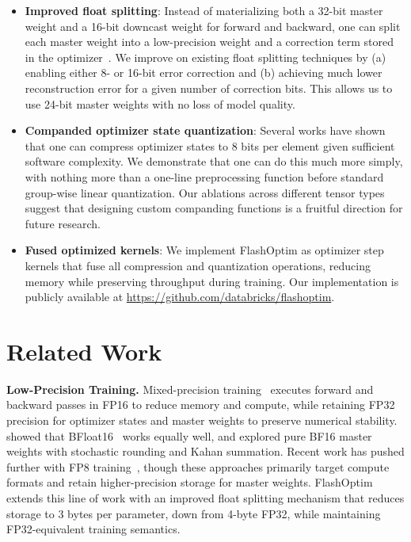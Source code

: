 \documentclass[10pt,twocolumn,letterpaper]{article}
\theoremstyle{plain}
\theoremstyle{definition}
\theoremstyle{remark}
\newcommand{\flashOptim}{FlashOptim\xspace}
\begin{document}
\begin{itemize}[itemsep=-2pt]
    \item \textbf{Improved float splitting}: Instead of materializing both a 32-bit master weight and a 16-bit downcast weight for forward and backward, one can split each master weight into a low-precision weight and a correction term stored in the optimizer~\citep{zamirai2020revisiting,warner2024optimi}. We improve on existing float splitting techniques by (a) enabling either 8- or 16-bit error correction and (b) achieving much lower reconstruction error for a given number of correction bits. This allows us to use 24-bit master weights with no loss of model quality.
    \item \textbf{Companded optimizer state quantization}: Several works have shown that one can compress optimizer states to 8 bits per element given sufficient software complexity. We demonstrate that one can do this much more simply, with nothing more than a one-line preprocessing function before standard group-wise linear quantization. Our ablations across different tensor types suggest that designing custom companding functions is a fruitful direction for future research. 
    \item \textbf{Fused optimized kernels}: We implement \flashOptim as optimizer step kernels that fuse all compression and quantization operations, reducing memory while preserving throughput during training. Our implementation is publicly available at \url{https://github.com/databricks/flashoptim}.
\end{itemize}






\section{Related Work} \label{sec:relatedWork}

\textbf{Low-Precision Training.}
Mixed-precision training~\citep{micikevicius2018mixed} executes forward and backward passes in FP16 to reduce memory and compute, while retaining FP32 precision for optimizer states and master weights to preserve numerical stability.
\citet{kalamkar2019bfloat16} showed that BFloat16~\citep{google_cloud_bfloat16_2019} works equally well, and \citet{zamirai2020revisiting} explored pure BF16 master weights with stochastic rounding and Kahan summation.
Recent work has pushed further with FP8 training~\citep{wang2018training,mellempudi2019mixed,micikevicius2022fp8,fishman2024scaling,narayan2025mu}, though these approaches primarily target compute formats and retain higher-precision storage for master weights.
\flashOptim extends this line of work with an improved float splitting mechanism that reduces storage to 3 bytes per parameter, down from 4-byte FP32, while maintaining FP32-equivalent training semantics.
\end{document}
